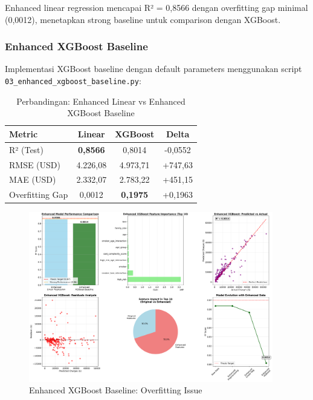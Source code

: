 Enhanced linear regression mencapai R² = 0,8566 dengan overfitting gap minimal (0,0012), menetapkan strong baseline untuk comparison dengan XGBoost.

\subsubsection{Enhanced XGBoost Baseline}

Implementasi XGBoost baseline dengan default parameters menggunakan script \texttt{03\_enhanced\_xgboost\_baseline.py}:

\begin{table}[H]
\centering
\caption{Perbandingan: Enhanced Linear vs Enhanced XGBoost Baseline}
\label{tab:baseline-comparison}
\begin{tabular}{|l|c|c|c|}
\hline
\textbf{Metric} & \textbf{Linear} & \textbf{XGBoost} & \textbf{Delta} \\
\hline
R² (Test) & \textbf{0,8566} & 0,8014 & -0,0552 \\
RMSE (USD) & 4.226,08 & 4.973,71 & +747,63 \\
MAE (USD) & 2.332,07 & 2.783,22 & +451,15 \\
Overfitting Gap & 0,0012 & \textbf{0,1975} & +0,1963 \\
\hline
\end{tabular}
\end{table}

\begin{figure}[H]
\centering
\includegraphics[width=0.95\textwidth]{../results/plots/03_enhanced_xgboost_baseline.png}
\caption{Enhanced XGBoost Baseline: Overfitting Issue}
\label{fig:xgboost-baseline}
\end{figure}

